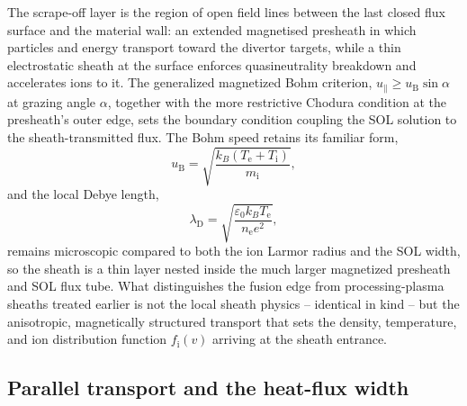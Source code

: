 The scrape-off layer is the region of open field lines between the last closed flux surface and the material wall: an extended magnetised presheath in which particles and energy transport toward the divertor targets, while a thin electrostatic sheath at the surface enforces quasineutrality breakdown and accelerates ions to it. The generalized magnetized Bohm criterion, $u_{\parallel} \geq u_{\mathrm{B}}\sin\alpha$ at grazing angle $\alpha$, together with the more restrictive Chodura condition at the presheath's outer edge, sets the boundary condition coupling the SOL solution to the sheath-transmitted flux. The Bohm speed retains its familiar form,
\begin{equation}
u_{\mathrm{B}} = \sqrt{\frac{k_{B}\left(T_{\mathrm{e}} + T_{\mathrm{i}}\right)}{m_{\mathrm{i}}}},
\label{eq:fusion_bohm}
\end{equation}
and the local Debye length,
\begin{equation}
\lambda_{\mathrm{D}} = \sqrt{\frac{\varepsilon_{0} k_{B} T_{\mathrm{e}}}{n_{\mathrm{e}} e^{2}}},
\label{eq:fusion_debye}
\end{equation}
remains microscopic compared to both the ion Larmor radius and the SOL width, so the sheath is a thin layer nested inside the much larger magnetized presheath and SOL flux tube. What distinguishes the fusion edge from processing-plasma sheaths treated earlier is not the local sheath physics -- identical in kind -- but the anisotropic, magnetically structured transport that sets the density, temperature, and ion distribution function $f_{\mathrm{i}}(v)$ arriving at the sheath entrance.

\subsection{Parallel transport and the heat-flux width}


